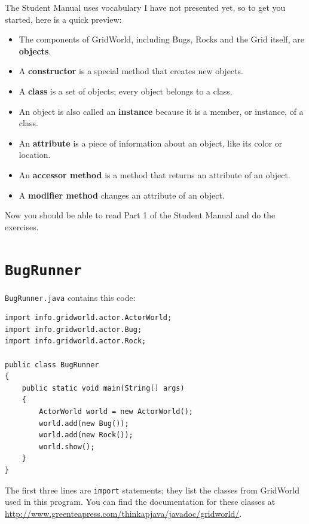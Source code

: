 \documentclass[12pt]{book}
\theoremstyle{exercise}
\begin{document}
The Student Manual uses vocabulary I have not presented yet, so to
get you started, here is a quick preview:

\begin{itemize}

\item The components of GridWorld, including Bugs, Rocks and the Grid
itself, are {\bf objects}.

\item A {\bf constructor} is a special method that creates new objects.

\item A {\bf class} is a set of objects; every object belongs to a
class.

\item An object is also called an {\bf instance} because it is a member,
or instance, of a class.

\item An {\bf attribute} is a piece of information about an object, like
its color or location.

\item An {\bf accessor method} is a method that returns an attribute of
an object.

\item A {\bf modifier method} changes an attribute of an object.

\end{itemize}

Now you should be able to read Part 1 of the Student Manual and do
the exercises.

\section{{\tt BugRunner}}

{\tt BugRunner.java} contains this code:

\begin{lstlisting}
import info.gridworld.actor.ActorWorld;
import info.gridworld.actor.Bug;
import info.gridworld.actor.Rock;

public class BugRunner
{
    public static void main(String[] args)
    {
        ActorWorld world = new ActorWorld();
        world.add(new Bug());
        world.add(new Rock());
        world.show();
    }
}
\end{lstlisting}

The first three lines are {\tt import} statements; they list the
classes from GridWorld used in this program.  You can find the
documentation for these classes at
\url{http://www.greenteapress.com/thinkapjava/javadoc/gridworld/}.
\end{document}
